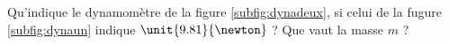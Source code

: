 

\begin{exercice} \label{exo:dyno_un} \label{exo011}
Qu'indique le dynamomètre de la figure \ref{subfig:dynadeux}, si celui de la fugure \ref{subfig:dynaun} indique $\unit{9.81}{\newton}$ ? Que vaut la masse $m$ ?
\end{exercice}
